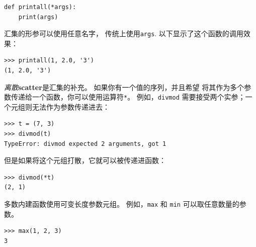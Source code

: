 \begin{lstlisting}
def printall(*args):
    print(args)
\end{lstlisting}

%

汇集的形参可以使用任意名字， 传统上使用\lstinline{args}. 以下显示了这个函数的调用效果：

\begin{lstlisting}
>>> printall(1, 2.0, '3')
(1, 2.0, '3')
\end{lstlisting}

%

\emph{离散}{\bf scatter}是汇集的补充。 如果你有一个值的序列，并且希望
将其作为多个参数传递给一个函数，你可以使用运算符\lstinline{*}。
例如，\lstinline{divmod} 需要接受两个实参；一个元组则无法作为参数传递进去：

  

\begin{lstlisting}
>>> t = (7, 3)
>>> divmod(t)
TypeError: divmod expected 2 arguments, got 1
\end{lstlisting}

%

但是如果将这个元组打散，它就可以被传递进函数：

\begin{lstlisting}
>>> divmod(*t)
(2, 1)
\end{lstlisting}

%

多数内建函数使用可变长度参数元组。 例如，\lstinline{max} 和 \lstinline{min} 可以取任意数量的参数。

 
 

\begin{lstlisting}
>>> max(1, 2, 3)
3
\end{lstlisting}


